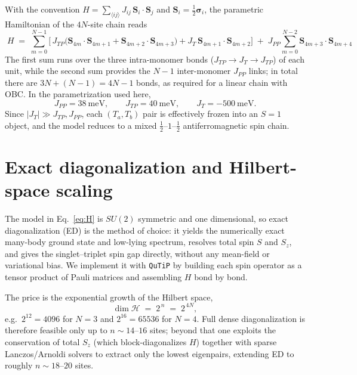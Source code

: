 \documentclass[11pt]{article}
\begin{document}
With the convention $H=\sum_{\langle ij\rangle} J_{ij}\,
\mathbf{S}_i\!\cdot\!\mathbf{S}_j$ and $\mathbf{S}_i=\tfrac12\boldsymbol{\sigma}_i$,
the parametric Hamiltonian of the $4N$-site chain reads
\begin{equation}
\boxed{\;
  H \;=\;
  \sum_{m=0}^{N-1}
  \Big[\,
      J_{TP}\big(\mathbf{S}_{4m}\!\cdot\!\mathbf{S}_{4m+1}
               +\mathbf{S}_{4m+2}\!\cdot\!\mathbf{S}_{4m+3}\big)
    + J_{T}\,\mathbf{S}_{4m+1}\!\cdot\!\mathbf{S}_{4m+2}
  \Big]
  \;+\;
  J_{PP}\sum_{m=0}^{N-2}
      \mathbf{S}_{4m+3}\!\cdot\!\mathbf{S}_{4m+4}
\;}
\label{eq:H}
\end{equation}
The first sum runs over the three intra-monomer bonds
($J_{TP}\!\rightarrow\! J_{T}\!\rightarrow\! J_{TP}$) of each unit, while the
second sum provides the $N-1$ inter-monomer $J_{PP}$ links; in total there
are $3N+(N-1)=4N-1$ bonds, as required for a linear chain with OBC.
In the parametrization used here,
\begin{equation}
  J_{PP}=38~\text{meV},\qquad
  J_{TP}=40~\text{meV},\qquad
  J_{T}=-500~\text{meV}.
\end{equation}
Since $|J_T|\gg J_{TP},J_{PP}$, each $(T_a,T_b)$ pair is effectively frozen
into an $S=1$ object, and the model reduces to a mixed
$\tfrac12$--$1$--$\tfrac12$ antiferromagnetic spin chain.

\section{Exact diagonalization and Hilbert-space scaling}

The model in Eq.~\eqref{eq:H} is $SU(2)$ symmetric and one dimensional, so
exact diagonalization (ED) is the method of choice: it yields the numerically
exact many-body ground state and low-lying spectrum, resolves total spin
$S$ and $S_z$, and gives the singlet--triplet spin gap directly, without any
mean-field or variational bias. We implement it with \texttt{QuTiP} by
building each spin operator as a tensor product of Pauli matrices and
assembling $H$ bond by bond.

The price is the exponential growth of the Hilbert space,
\begin{equation}
  \dim \mathcal{H} \;=\; 2^{\,n} \;=\; 2^{\,4N},
\end{equation}
e.g.\ $2^{12}=4096$ for $N=3$ and $2^{16}=65536$ for $N=4$. Full
dense diagonalization is therefore feasible only up to $n\!\sim\!14$--$16$
sites; beyond that one exploits the conservation of total $S_z$
(which block-diagonalizes $H$) together with sparse Lanczos/Arnoldi solvers
to extract only the lowest eigenpairs, extending ED to roughly
$n\!\sim\!18$--$20$ sites.
\end{document}
